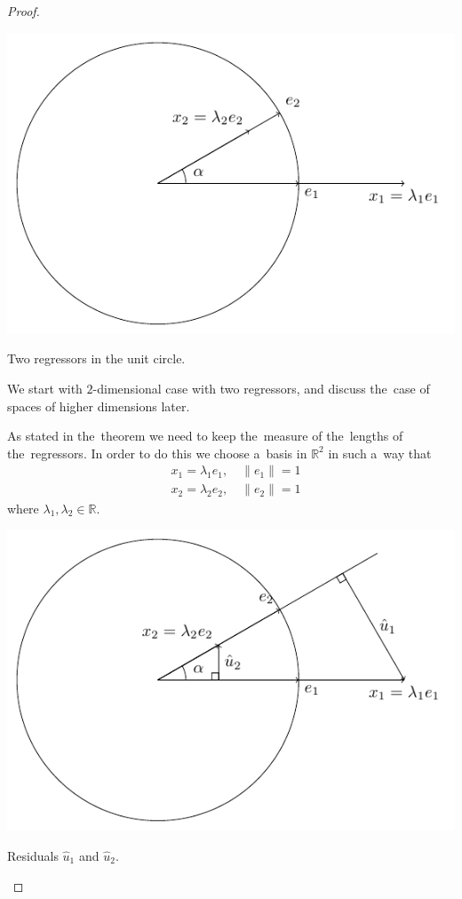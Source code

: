 \begin{proof}

\begin{marginfigure}[-2\baselineskip]
\includegraphics[scale=0.7]{figures/02_duality_original_regressors.pdf}
\caption{Two regressors in the unit circle.}
\end{marginfigure}

We start with $2$-dimensional case with two regressors,
and discuss the~case of spaces of higher dimensions later.

As stated in the~theorem we need to keep the~measure of the~lengths of the~regressors.
In order to do this we choose a~basis in $\mathbb{R}^2$ in such a~way that
\begin{align*}
&x_1 = \lambda_1 e_1, \quad \lVert e_1 \rVert = 1 \\
&x_2 = \lambda_2 e_2, \quad \lVert e_2 \rVert = 1
\end{align*}
where $\lambda_1, \lambda_2 \in \mathbb{R}$.

\begin{marginfigure}
\includegraphics[scale=0.7]{figures/02_duality_first_residuals.pdf}
\label{fig:duality_fst_residuals}
\caption{Residuals $\hat{u}_1$ and $\hat{u}_2$.}
\end{marginfigure}


\end{proof}
